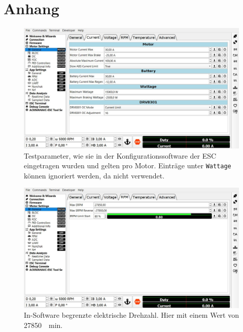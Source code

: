 \appendix
\chapter{Anhang}
	\begin{figure}[h]
		\centering
		\includegraphics[width=\textwidth]{Assets/ESC_Motor_Parameters.jpg}
		\caption[Testparameter, wie sie in der Konfigurationssoftware der ESC eingetragen wurden]{Testparameter, wie sie in der Konfigurationssoftware der ESC eingetragen wurden und gelten pro Motor. Einträge unter \texttt{Wattage} können ignoriert werden, da nicht verwendet.}%
		\label{fig:ESC motor params}
	\end{figure}
	\newpage
	\begin{figure}[h]
		\centering
		\includegraphics[width=\textwidth]{Assets/ESC_erpm.jpg}
		\caption[In-Software begrenzte elektrische Drehzahl]{In-Software begrenzte elektrische Drehzahl. Hier mit einem Wert von \qty{27850}{\per\minute}.}%
		\label{fig:ESC erpm setting}
	\end{figure}
